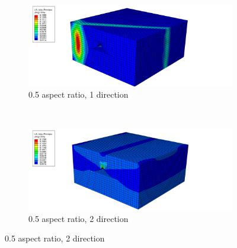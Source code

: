 \begin{figure}
  \begin{subfigure}[b]{0.70\textwidth}
    \includegraphics[width=\textwidth]{chapter_7_non-elasticmodelling/figures/05p1.png}
    \caption{0.5 aspect ratio, 1 direction}
  \end{subfigure}
  \\
    \begin{subfigure}[b]{0.70\textwidth}
    \includegraphics[width=\textwidth]{chapter_7_non-elasticmodelling/figures/05p2.png}
    \caption{0.5 aspect ratio, 2 direction}
  \end{subfigure}
  \end{figure}
